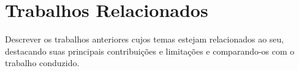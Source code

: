 \chapter{Trabalhos Relacionados}
\label{chapter:trabalhosRelacionados}

Descrever os trabalhos anteriores cujos temas estejam relacionados ao seu, destacando suas principais contribuições e limitações e comparando-os com o trabalho conduzido.  
